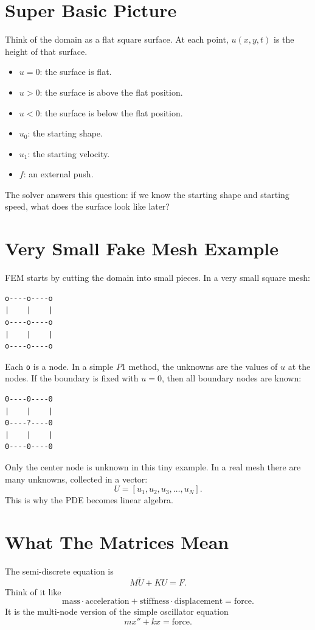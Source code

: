 \documentclass[11pt,a4paper]{article}
\begin{document}
\section{Super Basic Picture}
Think of the domain as a flat square surface. At each point, \(u(x,y,t)\) is the height
of that surface.

\begin{itemize}
\item \(u=0\): the surface is flat.
\item \(u>0\): the surface is above the flat position.
\item \(u<0\): the surface is below the flat position.
\item \(u_0\): the starting shape.
\item \(u_1\): the starting velocity.
\item \(f\): an external push.
\end{itemize}

The solver answers this question: if we know the starting shape and starting speed,
what does the surface look like later?

\section{Very Small Fake Mesh Example}
FEM starts by cutting the domain into small pieces. In a very small square mesh:

\begin{verbatim}
o----o----o
|    |    |
o----o----o
|    |    |
o----o----o
\end{verbatim}

Each \texttt{o} is a node. In a simple \(P1\) method, the unknowns are the values of
\(u\) at the nodes. If the boundary is fixed with \(u=0\), then all boundary nodes
are known:

\begin{verbatim}
0----0----0
|    |    |
0----?----0
|    |    |
0----0----0
\end{verbatim}

Only the center node is unknown in this tiny example. In a real mesh there are many
unknowns, collected in a vector:
\[
U = [u_1,u_2,u_3,\ldots,u_N].
\]
This is why the PDE becomes linear algebra.

\section{What The Matrices Mean}
The semi-discrete equation is
\[
M\ddot U + KU = F.
\]
Think of it like
\[
\text{mass}\cdot\text{acceleration}
+
\text{stiffness}\cdot\text{displacement}
=
\text{force}.
\]
It is the multi-node version of the simple oscillator equation
\[
m x'' + kx = \text{force}.
\]
\end{document}
